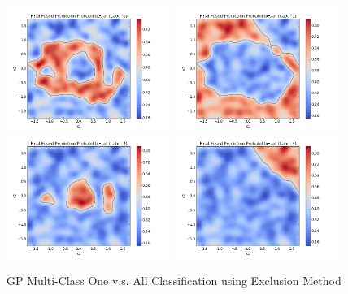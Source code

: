 				\begin{figure}[!htbp]
					\centering
						\includegraphics[width=0.48\textwidth]{Figures/Progress/exclusionOVA/Figure5.png}
						\includegraphics[width=0.48\textwidth]{Figures/Progress/exclusionOVA/Figure6.png}
						\includegraphics[width=0.48\textwidth]{Figures/Progress/exclusionOVA/Figure7.png}
						\includegraphics[width=0.48\textwidth]{Figures/Progress/exclusionOVA/Figure8.png}
					\caption{GP Multi-Class One v.s. All Classification using Exclusion Method}
					\label{ProgressReport:GaussianProcessModels:Figure:exclusionOVA2}
				\end{figure}
				
